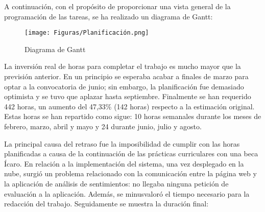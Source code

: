 \newpage

A continuación, con el propósito de proporcionar una vista general de la programación de las tareas, se ha realizado un diagrama de Gantt:

\begin{figure}[ht]
	\begin{center}
		\texttt{[image: Figuras/Planificación.png]}
	\end{center}
	\caption{\label{fig:Gantt} Diagrama de Gantt}
\end{figure}\textbf{}

La inversión real de horas para completar el trabajo es mucho mayor que la previsión anterior. En un principio se esperaba acabar a finales de marzo para optar a la convocatoria de junio; sin embargo, la planificación fue demasiado optimista y se tuvo que aplazar hasta septiembre. Finalmente se han requerido 442 horas, un aumento del 47,33\% (142 horas) respecto a la estimación original. Estas horas se han repartido como sigue: 10 horas semanales durante los meses de febrero, marzo, abril y mayo y 24 durante junio, julio y agosto. 
\newline

La principal causa del retraso fue la imposibilidad de cumplir con las horas planificadas a causa de la continuación de las prácticas curriculares con una beca Ícaro. En relación a la implementación del sistema, una vez desplegado en la nube, surgió un problema relacionado con la comunicación entre la página web y la aplicación de análisis de sentimientos: no llegaba ninguna petición de evaluación a la aplicación. Además, se minusvaloró el tiempo necesario para la redacción del trabajo. Seguidamente se muestra la duración final:

\newpage


